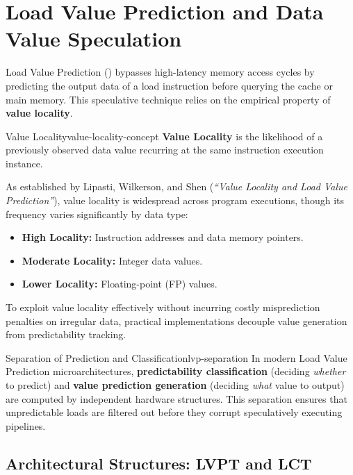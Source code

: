 \section{Load Value Prediction and Data Value Speculation}
\label{sec:load_value_prediction_speculation}

Load Value Prediction () bypasses high-latency memory access cycles by predicting the output data of a load instruction before querying the cache or main memory. This speculative technique relies on the empirical property of \textbf{value locality}.

\begin{concept}{Value Locality}{value-locality-concept}
\textbf{Value Locality} is the likelihood of a previously observed data value recurring at the same instruction execution instance. 

As established by Lipasti, Wilkerson, and Shen (\textit{``Value Locality and Load Value Prediction''}), value locality is widespread across program executions, though its frequency varies significantly by data type:
\begin{itemize}
    \item \textbf{High Locality:} Instruction addresses and data memory pointers.
    \item \textbf{Moderate Locality:} Integer data values.
    \item \textbf{Lower Locality:} Floating-point (FP) values.
\end{itemize}
\end{concept}

To exploit value locality effectively without incurring costly misprediction penalties on irregular data, practical implementations decouple value generation from predictability tracking.

\begin{observation}{Separation of Prediction and Classification}{lvp-separation}
In modern Load Value Prediction microarchitectures, \textbf{predictability classification} (deciding \textit{whether} to predict) and \textbf{value prediction generation} (deciding \textit{what} value to output) are computed by independent hardware structures. This separation ensures that unpredictable loads are filtered out before they corrupt speculatively executing pipelines.
\end{observation}

\subsection{Architectural Structures: LVPT and LCT}

